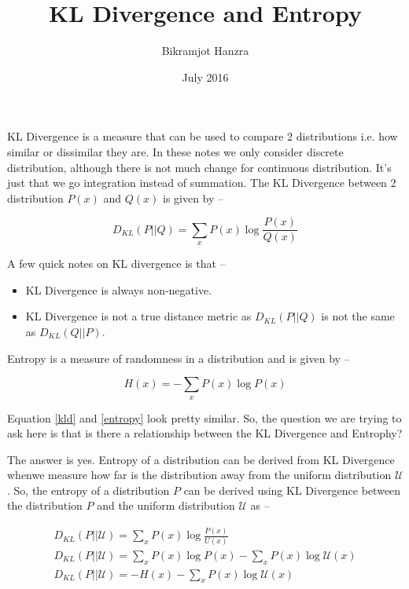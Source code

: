 \documentclass{article}
\title{KL Divergence and Entropy}
\author{Bikramjot Hanzra}
\date{July 2016}
\begin{document}
\maketitle

KL Divergence is a measure that can be used to compare 2 distributions i.e. how similar or dissimilar they are. In these notes we only consider discrete distribution, although there is not much change for continuous distribution. It's just that we go integration instead of summation. The KL Divergence between 2 distribution $P(x)$ and $Q(x)$ is given by -- 

\begin{equation}
\label{kld}
D_{KL}(P || Q) = \sum_{x}P(x)\log\frac{P(x)}{Q(x)}
\end{equation}

A few quick notes on KL divergence is that --

\begin{itemize}
    \item KL Divergence is always non-negative.
    \item KL Divergence is not a true distance metric as $D_{KL}(P || Q)$ is not the same as $D_{KL}(Q || P)$.
\end{itemize}

Entropy is a measure of randomness in a distribution and is given by --

\begin{equation}
\label{entropy}
H(x) = -\sum_{x}P(x)\log P(x)
\end{equation}


Equation \ref{kld} and \ref{entropy} look pretty similar. So, the question we are trying to ask here is that is there a relationship between the KL Divergence and Entrophy?

The answer is yes. Entropy of a distribution can be derived from KL Divergence whenwe measure how far is the distribution away from the uniform distribution $\mathcal{U}$. So, the entropy of a distribution $P$ can be derived using KL Divergence between the distribution $P$ and the uniform distribution $\mathcal{U}$ as --

\begin{align}
D_{KL}(P || \mathcal{U}) = \sum_{x}P(x)\log\frac{P(x)}{U(x)} \\
D_{KL}(P || \mathcal{U}) = \sum_{x}P(x)\log P(x) - \sum_{x}P(x)\log \mathcal{U}(x)\\
D_{KL}(P || \mathcal{U}) = -H(x) - \sum_{x}P(x)\log \mathcal{U}(x) \label{eqn:dl:3}
\end{align}
\end{document}
